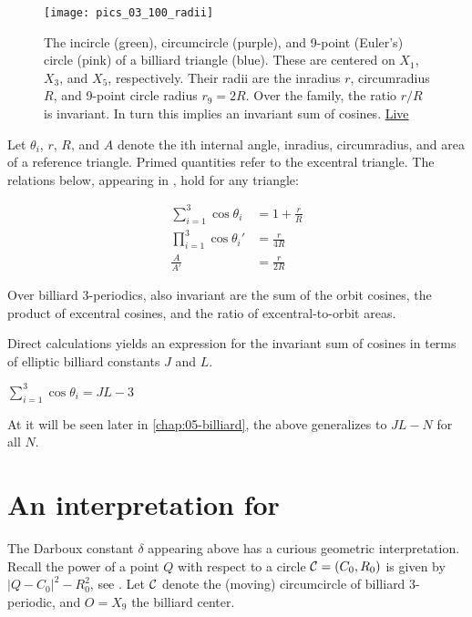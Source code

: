 \begin{figure}
    \centering
    \texttt{[image: pics\_03\_100\_radii]}
    \caption{The incircle (green), circumcircle (purple), and 9-point (Euler's) circle (pink) of a billiard triangle (blue). These are centered on $X_1$, $X_3$, and $X_5$, respectively. Their radii are the inradius $r$, circumradius $R$, and 9-point circle radius $r_9=2R$. Over the family, the ratio $r/R$ is invariant. In turn this implies an invariant sum of cosines. \href{https://bit.ly/337hvpf}{Live}}
    \label{fig:radii}
\end{figure}

Let $\theta_i$, $r$, $R$, and $A$ denote the ith internal angle, inradius, circumradius, and area of a reference triangle. Primed quantities refer to the excentral triangle. The relations below, appearing in  \cite{johnson1960},  hold for any triangle:

\begin{align}
\sum_{i=1}^{3}{\cos\theta_i}&=1+\frac{r}{R} \label{eqn:03-sum-cos} \\
\prod_{i=1}^{3}{\cos\theta_i'}&=\frac{r}{4R} \label{eqn:03-exc-prod-cos} \\
\frac{A}{A'}&=\frac{r}{2R} \label{eqn:03-area-ratio}
\end{align}

\begin{corollary}
Over billiard 3-periodics, also invariant are the sum of the orbit cosines, the product of excentral cosines, and the ratio of excentral-to-orbit areas.
\label{cor:03-rOvR}
\end{corollary}

Direct calculations yields an expression for the invariant sum of cosines in terms of elliptic billiard constants $J$ and $L$.

\begin{corollary}
$\sum_{i=1}^{3}{\cos\theta_i}=J L - 3$
\end{corollary}

At it will be seen later in \cref{chap:05-billiard}, the above generalizes to $J L -N$ for all $N$.

\section{An interpretation for }

The Darboux constant $\delta$ appearing above has a curious geometric interpretation. Recall the power of a point $Q$ with respect to a circle $\mathcal{C}=(C_0,R_0)$ is given by $|Q-C_0|^2-R_0^2$, see \cite[Circle Power]{mw}. Let $\mathcal{C}$ denote the (moving) circumcircle of billiard 3-periodic, and $O=X_9$ the billiard center.

